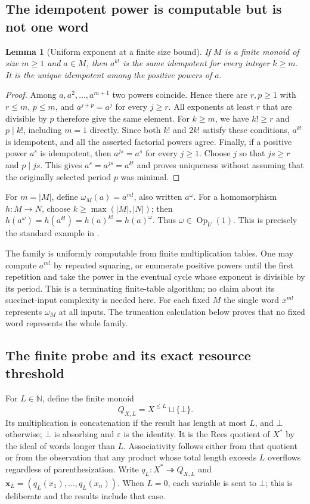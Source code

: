 \documentclass[11pt]{article}
\newtheorem{lemma}[theorem]{Lemma}
\theoremstyle{definition}
\theoremstyle{remark}
\newcommand{\N}{\mathbb N}
\newcommand{\Op}{\operatorname{Op}}
\newcommand{\eps}{\varepsilon}
\begin{document}
\subsection{The idempotent power is computable but is not one word}
\label{mon-sec:omega}
\begin{lemma}[Uniform exponent at a finite size bound]
\label{mon-lem:factorial}
If $M$ is a finite monoid of size $m\geq1$ and $a\in M$, then
$a^{k!}$ is the same idempotent for every integer $k\geq m$.
It is the unique idempotent among the positive powers of $a$.
\end{lemma}
\begin{proof}
Among $a,a^2,\ldots,a^{m+1}$ two powers coincide. Hence there are
$r,p\geq1$ with $r\leq m$, $p\leq m$, and
$a^{j+p}=a^j$ for every $j\geq r$. All exponents at least $r$ that
are divisible by $p$ therefore give the same element. For $k\geq m$,
we have $k!\geq r$ and $p\mid k!$, including $m=1$ directly.
Since both $k!$ and $2k!$ satisfy these conditions, $a^{k!}$ is idempotent,
and all the asserted factorial powers agree. Finally, if a positive power
$a^s$ is idempotent, then $a^{js}=a^s$ for every $j\geq1$. Choose $j$
so that $js\geq r$ and $p\mid js$. This gives
$a^s=a^{js}=a^{k!}$ and proves uniqueness without assuming that the
originally selected period $p$ was minimal.
\end{proof}

For $m=|M|$, define $\omega_M(a)=a^{m!}$, also written $a^\omega$.
For a homomorphism $h:M\to N$, choose $k\geq\max(|M|,|N|)$;
then $h(a^\omega)=h(a^{k!})=h(a)^{k!}=h(a)^\omega$.
Thus $\omega\in\Op_U(1)$. This is precisely the standard example in
\cite[Example 5.17]{ACMU}.

The family is uniformly computable from finite multiplication tables.
One may compute $a^{m!}$ by repeated squaring, or enumerate positive powers
until the first repetition and take the power in the eventual cycle whose
exponent is divisible by its period. This is a terminating finite-table
algorithm; no claim about its succinct-input complexity is needed here.
For each fixed $M$ the single word $x^{m!}$ represents $\omega_M$ at all
inputs. The truncation calculation below proves that no fixed word represents
the whole family.

\subsection{The finite probe and its exact resource threshold}
\label{mon-sec:probe}
For $L\in\N$, define the finite monoid
\[
 Q_{X,L}=X^{\leq L}\sqcup\{\bot\}.
\]
Its multiplication is concatenation if the result has length at most $L$,
and $\bot$ otherwise; $\bot$ is absorbing and $\eps$ is the identity.
It is the Rees quotient of $X^*$ by the ideal of words longer than $L$.
Associativity follows either from that quotient or from the observation
that any product whose total length exceeds $L$ overflows regardless of
parenthesization. Write $q_L:X^*\twoheadrightarrow Q_{X,L}$ and
$\mathbf x_L=(q_L(x_1),\ldots,q_L(x_n))$. When $L=0$, each variable is
sent to $\bot$; this is deliberate and the results include that case.
\end{document}
